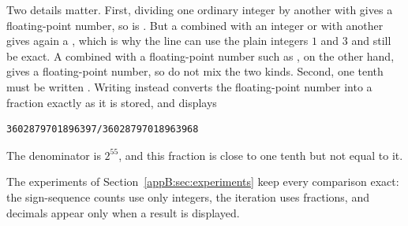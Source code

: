 Two details matter. First, dividing one ordinary integer by another with \code{/} gives a floating-point number, so  is . But a  combined with an integer or with another  gives again a , which is why the line  can use the plain integers $1$ and $3$ and still be exact. A  combined with a floating-point number such as , on the other hand, gives a floating-point number, so do not mix the two kinds. Second, one tenth must be written . Writing  instead converts the floating-point number  into a fraction exactly as it is stored, and  displays
\par\noindent\begin{minipage}{\linewidth}
\begin{lstlisting}
3602879701896397/36028797018963968
\end{lstlisting}
\end{minipage}\par
The denominator is $2^{55}$, and this fraction is close to one tenth but not equal to it.

The experiments of Section~\ref{appB:sec:experiments} keep every comparison exact: the sign-sequence counts use only integers, the iteration uses fractions, and decimals appear only when a result is displayed.
